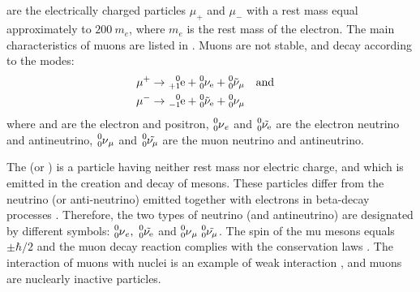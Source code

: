 \subsection{}\label{43.3.3}  are the electrically charged particles $\mu_{+}$ and $\mu_{-}$ with a rest mass equal approximately to $200~m_{e}$, where $m_{e}$ is the rest mass of the electron. The main characteristics of muons are listed in . Muons are not stable, and decay according to the modes:
\begin{align*}%
\mu^{+} & \to \ce{^{0}_{+1}e} + \ce{^{0}_{0}{\nu_{e}}} + \ce{^{0}_{0}{\tilde{\nu}_{\mu}}} \qand \\
\mu^{-} & \to \ce{^{0}_{-1}e} + \ce{^{0}_{0}{\tilde{\nu}_{e}}} + \ce{^{0}_{0}{\nu_{\mu}}}
\end{align*}
where  and  are the electron and positron, $\ce{^{0}_{0}\nu_{e}}$ and $\ce{^{0}_{0}\tilde{\nu_{e}}}$ are the electron neutrino and antineutrino, $\ce{^{0}_{0}\nu_{\mu}}$ and $\ce{^{0}_{0}\tilde{\nu_{\mu}}}$ are the muon neutrino and antineutrino.

The  (or ) is a particle having neither rest mass nor electric charge, and which is emitted in the creation and decay of mesons. These particles differ from the neutrino (or anti-neutrino) emitted together with electrons in beta-decay processes . Therefore, the two types of neutrino (and antineutrino) are designated by different symbols:
$\ce{^{0}_{0}\nu_{e}}, \; \ce{^{0}_{0}\tilde{\nu_{e}}}$
and $\ce{^{0}_{0}\nu_{\mu}} \; \ce{^{0}_{0}\tilde{\nu_{\mu}}}$. The spin of the mu mesons equals $\pm \hbar /2$ and the muon decay reaction complies with the conservation laws . The interaction of muons with nuclei is an example of weak interaction , and muons are nuclearly inactive particles.

